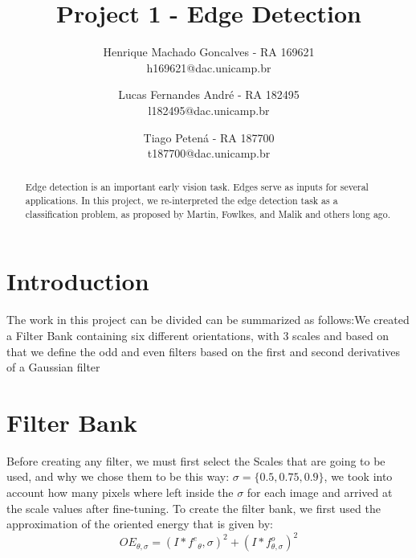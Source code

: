 \documentclass[]{IEEEtran}
\begin{document}
  \title{Project 1 - Edge Detection}
  \author{\IEEEauthorblockN
    {Henrique Machado Goncalves - RA 169621}\\
    \IEEEauthorblockA
    {
     h169621@dac.unicamp.br\\
    }
    \and
    \IEEEauthorblockN
     {Lucas Fernandes André - RA 182495}\\
    \IEEEauthorblockA
    {
    l182495@dac.unicamp.br\\
    }
    \and
    \IEEEauthorblockN
     {Tiago Petená - RA 187700}\\
    \IEEEauthorblockA
    {
        t187700@dac.unicamp.br
    }
  }
  \maketitle
  
  \begin{abstract}
   Edge detection is an important early vision task. Edges serve as inputs for several applications. In this project, we re-interpreted the edge detection task as a classification problem, as proposed by Martin, Fowlkes, and Malik and others long ago.
  \end{abstract}
  
  \section{Introduction}
    The work in this project can be divided can be summarized as follows:We created a Filter Bank containing six different orientations, with 3 scales and based on that we define the odd and even filters based on the first and second derivatives of a Gaussian filter
    
  \section{Filter Bank}
  Before creating any filter, we must first select the Scales that are going to be used, and why we chose them to be this way: $\sigma = \{0.5,0.75,0.9\}$, we took into account how many pixels where left inside the $\sigma$ for each image and arrived at the scale values after fine-tuning.
  To create the filter bank, we first used the approximation of the oriented energy that is given by:
  \[ OE_{\theta,\sigma} = (I * f^e{_\theta,\sigma})^2 + (I * f^o_{\theta,\sigma})^2 \]
  
\end{document}
